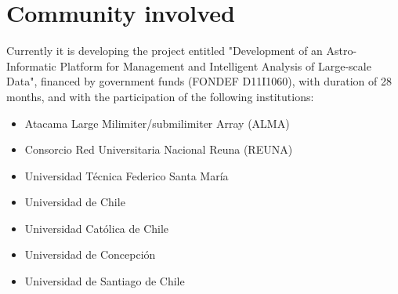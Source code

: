 %
%
%
%
%
%
%
%
%
%
%
%

\section{Community involved}

Currently it is developing the project entitled "Development of an Astro-Informatic Platform 
for Management and Intelligent Analysis of Large-scale Data", financed by government funds (FONDEF D11I1060), with
duration of 28 months, and with the participation of the following institutions:

\begin{itemize}
	\item Atacama Large Milimiter/submilimiter Array (ALMA)
	\item Consorcio Red Universitaria Nacional Reuna (REUNA)
	\item Universidad Técnica Federico Santa María
	\item Universidad de Chile
	\item Universidad Católica de Chile
	\item Universidad de Concepción
	\item Universidad de Santiago de Chile
\end{itemize}

